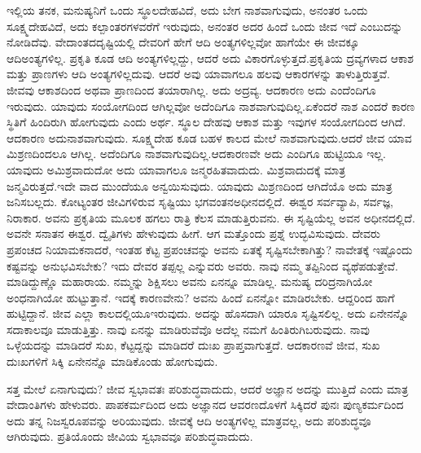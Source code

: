 ಇಲ್ಲಿಯ ತನಕ, ಮನುಷ್ಯನಿಗೆ ಒಂದು ಸ್ಥೂಲದೇಹವಿದೆ, ಅದು ಬೇಗ ನಾಶವಾಗುವುದು, ಅನಂತರ ಒಂದು ಸೂಕ್ಷ್ಮದೇಹವಿದೆ, ಅದು ಕಲ್ಪಾಂತರಗಳವರೆಗೆ ಇರುವುದು, ಅನಂತರ ಅದರ ಹಿಂದೆ ಒಂದು ಜೀವ ಇದೆ ಎಂಬುದನ್ನು ನೋಡಿದೆವು. ವೇದಾಂತದ\break ದೃಷ್ಟಿಯಲ್ಲಿ ದೇವರಿಗೆ ಹೇಗೆ ಆದಿ ಅಂತ್ಯಗಳಿಲ್ಲವೋ ಹಾಗೆಯೇ ಈ ಜೀವಕ್ಕೂ ಆದಿ\break ಅಂತ್ಯಗಳಿಲ್ಲ. ಪ್ರಕೃತಿ ಕೂಡ ಆದಿ ಅಂತ್ಯಗಳಿಲ್ಲದ್ದು, ಆದರೆ ಅದು ವಿಕಾರಗೊಳ್ಳುತ್ತದೆ.\break ಪ್ರಕೃತಿಯ ದ್ರವ್ಯಗಳಾದ ಆಕಾಶ ಮತ್ತು ಪ್ರಾಣಗಳು ಆದಿ ಅಂತ್ಯಗಳಿಲ್ಲದುವು. ಆದರೆ ಅವು ಯಾವಾಗಲೂ ಹಲವು ಆಕಾರಗಳನ್ನು ತಾಳುತ್ತಿರುತ್ತವೆ. ಜೀವವು ಆಕಾಶದಿಂದ ಅಥವಾ ಪ್ರಾಣದಿಂದ ತಯಾರಾಗಿಲ್ಲ. ಅದು ಅದ್ರವ್ಯ. ಆದಕಾರಣ ಅದು ಎಂದೆಂದಿಗೂ ಇರುವುದು. ಯಾವುದು ಸಂಯೋಗದಿಂದ ಆಗಿಲ್ಲವೋ ಅದೆಂದಿಗೂ ನಾಶವಾಗುವುದಿಲ್ಲ.\break ಏಕೆಂದರೆ ನಾಶ ಎಂದರೆ ಕಾರಣ ಸ್ಥಿತಿಗೆ ಹಿಂದಿರುಗಿ ಹೋಗುವುದು ಎಂದು ಅರ್ಥ. ಸ್ಥೂಲ ದೇಹವು ಆಕಾಶ ಮತ್ತು ಇವುಗಳ ಸಂಯೋಗದಿಂದ ಆಗಿದೆ. ಆದಕಾರಣ ಅದು\break ನಾಶವಾಗುವುದು. ಸೂಕ್ಷ್ಮದೇಹ ಕೂಡ ಬಹಳ ಕಾಲದ ಮೇಲೆ ನಾಶವಾಗುವುದು.\break ಆದರೆ ಜೀವ ಯಾವ ಮಿಶ್ರಣದಿಂದಲೂ ಆಗಿಲ್ಲ. ಅದೆಂದಿಗೂ ನಾಶವಾಗುವುದಿಲ್ಲ.\break ಆದಕಾರಣವೇ ಅದು ಎಂದಿಗೂ ಹುಟ್ಟಿಯೂ ಇಲ್ಲ. ಯಾವುದು ಅಮಿಶ್ರವಾದುದೋ ಅದು ಯಾವಾಗಲೂ ಜನ್ಮರಹಿತವಾದುದು. ಮಿಶ್ರವಾದುದಕ್ಕೆ ಮಾತ್ರ ಜನ್ಮವಿರುತ್ತದೆ.\break ಇದೇ ವಾದ ಮುಂದೆಯೂ ಅನ್ವಯಿಸುವುದು. ಯಾವುದು ಮಿಶ್ರಣದಿಂದ ಆಗಿದೆಯೊ ಅದು ಮಾತ್ರ ಜನಿಸಬಲ್ಲದು. ಕೋಟ್ಯಂತರ ಜೀವಿಗಳಿರುವ ಸೃಷ್ಟಿಯು ಭಗವಂತನ\break ಅಧೀನದಲ್ಲಿದೆ. ಈಶ್ವರ ಸರ್ವವ್ಯಾಪಿ, ಸರ್ವಜ್ಞ, ನಿರಾಕಾರ. ಅವನು ಪ್ರಕೃತಿಯ ಮೂಲಕ ಹಗಲು ರಾತ್ರಿ ಕೆಲಸ ಮಾಡುತ್ತಿರುವನು. ಈ ಸೃಷ್ಟಿಯೆಲ್ಲ ಅವನ ಅಧೀನದಲ್ಲಿದೆ. ಅವನೇ ಸನಾತನ ಈಶ್ವರ. ದ್ವೈತಿಗಳು ಹೇಳುವುದು ಹೀಗೆ. ಆಗ ಮತ್ತೊಂದು ಪ್ರಶ್ನೆ ಉದ್ಭವಿಸುವುದು. ದೇವರು ಪ್ರಪಂಚದ ನಿಯಾಮಕನಾದರೆ, ಇಂತಹ ಕೆಟ್ಟ ಪ್ರಪಂಚವನ್ನು ಅವನು ಏತಕ್ಕೆ ಸೃಷ್ಟಿಸಬೇಕಾಗಿತ್ತು? ನಾವೇತಕ್ಕೆ ಇಷ್ಟೊಂದು ಕಷ್ಟವನ್ನು ಅನುಭವಿಸಬೇಕು? ಇದು ದೇವರ ತಪ್ಪಲ್ಲ ಎನ್ನುವರು ಅವರು. ನಾವು ನಮ್ಮ ತಪ್ಪಿನಿಂದ ವ್ಯಥೆಪಡುತ್ತೇವೆ. ಮಾಡಿದ್ದುಣ್ಣೊ ಮಹಾರಾಯ. ನಮ್ಮನ್ನು ಶಿಕ್ಷಿಸಲು ಅವನು ಏನನ್ನೂ ಮಾಡಿಲ್ಲ. ಮನುಷ್ಯ ದರಿದ್ರನಾಗಿಯೋ ಅಂಧನಾಗಿಯೋ ಹುಟ್ಟುತ್ತಾನೆ. ಇದಕ್ಕೆ ಕಾರಣವೇನು? ಅವನು ಹಿಂದೆ ಏನನ್ನೋ ಮಾಡಿರಬೇಕು. ಆದ್ದರಿಂದ ಹಾಗೆ ಹುಟ್ಟಿದ್ದಾನೆ. ಜೀವ ಎಲ್ಲಾ ಕಾಲದಲ್ಲಿಯೂ\break ಇರುವುದು. ಅದನ್ನು ಹೊಸದಾಗಿ ಯಾರೂ ಸೃಷ್ಟಿಸಲಿಲ್ಲ. ಅದು ಏನೇನನ್ನೊ ಸದಾ\break ಕಾಲವೂ ಮಾಡುತ್ತಿತ್ತು. ನಾವು ಏನನ್ನು ಮಾಡಿರುವೆವೊ ಅದೆಲ್ಲ ನಮಗೆ ಹಿಂತಿರುಗಿ\break ಬರುವುದು. ನಾವು ಒಳ್ಳೆಯದನ್ನು ಮಾಡಿದರೆ ಸುಖ, ಕೆಟ್ಟದ್ದನ್ನು ಮಾಡಿದರೆ ದುಃಖ ಪ್ರಾಪ್ತವಾಗುತ್ತದೆ. ಆದಕಾರಣವೆ ಜೀವ, ಸುಖ ದುಃಖಗಳಿಗೆ ಸಿಕ್ಕಿ ಏನೇನನ್ನೊ ಮಾಡಿಕೊಂಡು ಹೋಗುವುದು.

ಸತ್ತ ಮೇಲೆ ಏನಾಗುವುದು? ಜೀವ ಸ್ವಭಾವತಃ ಪರಿಶುದ್ಧವಾದುದು, ಆದರೆ ಅಜ್ಞಾನ ಅದನ್ನು ಮುತ್ತಿದೆ ಎಂದು ಮಾತ್ರ ವೇದಾಂತಿಗಳು ಹೇಳುವರು. ಪಾಪಕರ್ಮದಿಂದ ಅದು ಅಜ್ಞಾನದ ಆವರಣದೊಳಗೆ ಸಿಕ್ಕಿದರೆ ಪುನಃ ಪುಣ್ಯಕರ್ಮದಿಂದ ಅದು ತನ್ನ ನಿಜಸ್ವರೂಪವನ್ನು ಅರಿಯುವುದು. ಜೀವಕ್ಕೆ ಆದಿ ಅಂತ್ಯಗಳಿಲ್ಲ ಮಾತ್ರವಲ್ಲ, ಅದು ಪರಿಶುದ್ಧವೂ ಆಗಿರುವುದು. ಪ್ರತಿಯೊಂದು ಜೀವಿಯ ಸ್ವಭಾವವೂ ಪರಿಶುದ್ಧವಾದುದು.


